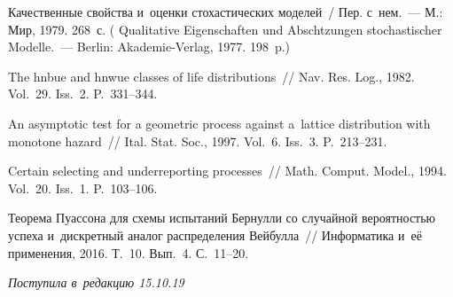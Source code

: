 \begin{multicols}{2}
{{\begin{thebibliography}{99}
 Качественные свойства и~оценки стохастических моделей~/
Пер. с~нем.~--- М.: Мир, 1979. 268~с.
(  {Qualitative Eigenschaften und Abschtzungen 
stochastischer Modelle}.~--- Berlin: Akademie-Verlag, 1977. 198~p.)


 The hnbue and hnwue classes of life distributions~// 
Nav. Res. Log., 1982.
Vol.~29. Iss.~2. P.~331--344.

 An asymptotic test for a geometric process against 
a~lattice distribution with monotone hazard~// Ital. Stat. Soc., 1997. 
Vol.~6. Iss.~3. P.~213--231.

Certain selecting and underreporting processes~// Math. Comput. Model., 1994. 
Vol.~20. Iss.~1. P.~103--106.

 Теорема Пуассона для схемы
испытаний Бернулли со случайной вероятностью успеха и~дискретный аналог
распределения Вейбулла~// Информатика и~её применения, 2016. Т.~10. Вып.~4. С.~11--20.

 \end{thebibliography}

 }
 }

\end{multicols}

\vspace*{-6pt}

\hfill{\small\textit{Поступила в~редакцию 15.10.19}}



\newpage

\vspace*{-28pt}





\def\tit{DISCRETE-TIME $\mathrm{Geo}/G/1/\infty$ LIFO QUEUE\\
 WITH~RESAMPLING POLICY}


\def\titkol{Discrete-time $\mathrm{Geo}/G/1/\infty$ LIFO queue with~resampling policy}

\def\aut{L.\,A.~Meykhanadzhyan$^1$ and R.\,V.~Razumchik$^{2,3}$}


